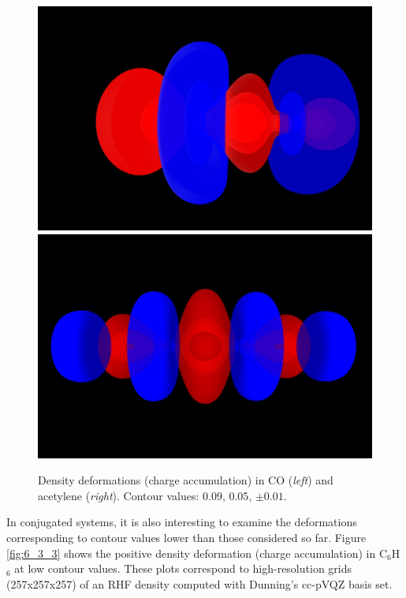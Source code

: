 \documentclass[10pt]{article}
\begin{document}
\begin{figure}[H]
\begin{center}
\includegraphics[width=.4\linewidth]{CO-def-b.png}
\hspace*{5mm}
\includegraphics[width=.4\linewidth]{C2H2-def-b.png}
\end{center}
\caption[Charge accumulation in CO]{ Density deformations (charge accumulation) in CO ({\it left}) and
acetylene ({\it right}). Contour values: $0.09$, $0.05$, $\pm 0.01$.
\label{fig:6_3_2}}
\end{figure}

In conjugated systems, it is also interesting to examine the deformations
corresponding to contour values lower than those considered so far. Figure
\ref{fig:6_3_3} shows the positive density deformation (charge accumulation) in
C$_6$H$_6$ at low contour values. These plots correspond to high-resolution
grids (257x257x257) of an RHF density computed with Dunning's cc-pVQZ basis
set.
\end{document}
